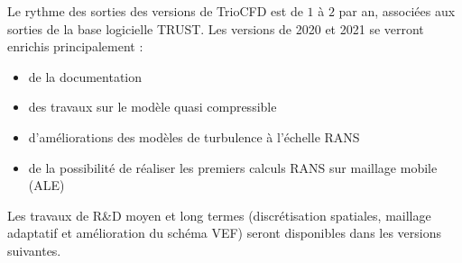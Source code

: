 Le rythme des sorties des versions de TrioCFD est de $1$ \`a $2$ par an, associ\'ees aux sorties de la base logicielle TRUST. Les versions de 2020 et 2021 se verront enrichis principalement : 
\begin{itemize}
\item de la documentation
\item des travaux sur le mod\`ele quasi compressible
\item d'am\'eliorations des mod\`eles de turbulence \`a l'\'echelle RANS
\item de la possibilit\'e de r\'ealiser les premiers calculs RANS sur maillage mobile (ALE)
\end{itemize}
Les travaux de R\&D moyen et long termes (discr\'etisation spatiales, maillage adaptatif et am\'elioration du sch\'ema VEF) seront disponibles dans les versions suivantes.
